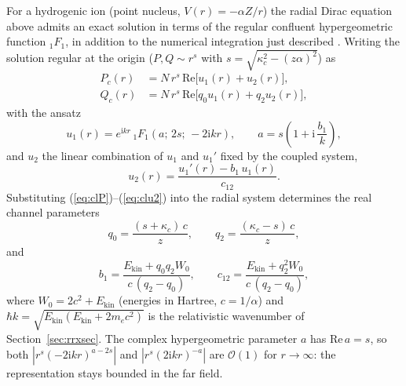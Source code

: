 \documentclass[11pt,a4paper]{article}
\newcommand{\iu}{\mathrm{i}}
\begin{document}
For a hydrogenic ion (point nucleus, $V(r)=-\alpha Z/r$) the radial Dirac
equation above admits an exact solution in terms of the regular confluent
hypergeometric function ${}_{1}F_{1}$, in addition to the numerical
integration just described \cite{Mueller1973}.  Writing the solution regular at the origin
($P,Q\sim r^{s}$ with $s=\sqrt{\kappa_{c}^{2}-(z\alpha)^{2}}$) as
\begin{align}
  P_{c}(r) &= N\,r^{s}\,\mathrm{Re}\bigl[u_{1}(r)+u_{2}(r)\bigr],
  \label{eq:clP}\\
  Q_{c}(r) &= N\,r^{s}\,\mathrm{Re}\bigl[q_{0}u_{1}(r)+q_{2}u_{2}(r)\bigr],
  \label{eq:clQ}
\end{align}
with the ansatz
\begin{equation}
  u_{1}(r) = e^{\iu kr}\,
    {}_{1}F_{1}\!\left(a;\,2s;\,-2\iu kr\right),
  \qquad
  a = s\left(1+\iu\,\frac{b_{1}}{k}\right),
  \label{eq:clu1}
\end{equation}
and $u_{2}$ the linear combination of $u_{1}$ and $u_{1}'$ fixed by the
coupled system,
\begin{equation}
  u_{2}(r) = \frac{u_{1}'(r) - b_{1}\,u_{1}(r)}{c_{12}}.
  \label{eq:clu2}
\end{equation}
Substituting (\ref{eq:clP})--(\ref{eq:clu2}) into the radial system
determines the real channel parameters
\begin{equation}
  q_{0} = \frac{(s+\kappa_{c})\,c}{z},\qquad
  q_{2} = \frac{(\kappa_{c}-s)\,c}{z},
  \label{eq:clq}
\end{equation}
and
\begin{equation}
  b_{1} = \frac{E_{\mathrm{kin}}+q_{0}q_{2}W_{0}}{c\,(q_{2}-q_{0})},\qquad
  c_{12} = \frac{E_{\mathrm{kin}}+q_{2}^{2}W_{0}}{c\,(q_{2}-q_{0})},
  \label{eq:clb}
\end{equation}
where $W_{0}=2c^{2}+E_{\mathrm{kin}}$ (energies in Hartree, $c=1/\alpha$)
and $\hbar k=\sqrt{E_{\mathrm{kin}}(E_{\mathrm{kin}}+2m_{e}c^{2})}$ is the
relativistic wavenumber of Section~\ref{sec:rrxsec}.  The complex
hypergeometric parameter $a$ has $\mathrm{Re}\,a=s$, so both
$|r^{s}(-2\iu kr)^{a-2s}|$ and $|r^{s}(2\iu kr)^{-a}|$ are $\mathcal{O}(1)$
for $r\to\infty$: the representation stays bounded in the far field.
\end{document}
